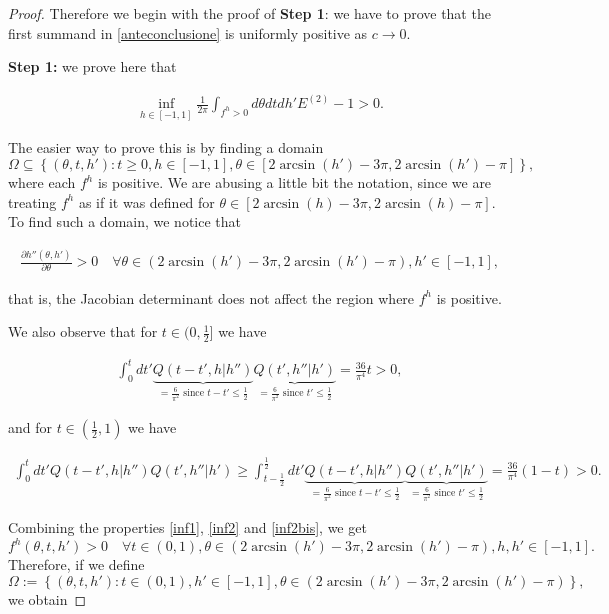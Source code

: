 \documentclass[a4paper,10pt,reqno]{amsart}
\numberwithin{equation}{subsection}
\numberwithin{figure}{subsection}
\begin{document}
\begin{proof}
Therefore we begin with the proof of \textbf{Step 1}: we have to prove that the first summand in \eqref{anteconclusione} is uniformly positive as $c\to0$.

\textbf{Step 1:} we prove here that

\begin{align}\label{derivataneg}
\inf_{h\in[-1,1]}\frac{1}{2\pi}\int_{f^h>0}d\theta dtdh' E^{(2)}-1>0.
\end{align}

The easier way to prove this is by finding a domain
\[
\Omega\subseteq\left\{(\theta,t,h'):t\geq0,h\in[-1,1],\theta\in[2\arcsin(h')-3\pi,2\arcsin(h')-\pi]\right\},
\]
where each $f^h$ is positive. We are abusing a little bit the notation, since we are treating $f^h$ as if it was defined for $\theta\in[2\arcsin(h)-3\pi,2\arcsin(h)-\pi]$. To find such a domain, we notice that

\begin{align}\label{inf1}
\frac{\partial h''(\theta,h')}{\partial\theta}>0\quad\forall\theta\in(2\arcsin(h')-3\pi,2\arcsin(h')-\pi),h'\in[-1,1],
\end{align}

that is, the Jacobian determinant does not affect the region where $f^h$ is positive.

We also observe that for $t\in(0,\frac{1}{2}]$ we have

\begin{align}\label{inf2}
\int_0^tdt' \underbrace{Q(t-t',h|h'')}_{=\frac{6}{\pi^2}\textrm{ since }t-t'\leq\frac{1}{2}}\underbrace{Q(t',h''|h')}_{=\frac{6}{\pi^2}\textrm{ since }t'\leq\frac{1}{2}}=\frac{36}{\pi^4}t>0,
\end{align}

and for $t\in(\frac{1}{2},1)$ we have

{\footnotesize\begin{align}\label{inf2bis}
\int_0^tdt' Q(t-t',h|h'')Q(t',h''|h')\geq\int_{t-\frac{1}{2}}^{\frac{1}{2}}dt' \underbrace{Q(t-t',h|h'')}_{=\frac{6}{\pi^2}\textrm{ since }t-t'\leq\frac{1}{2}}\underbrace{Q(t',h''|h')}_{=\frac{6}{\pi^2}\textrm{ since }t'\leq\frac{1}{2}}=\frac{36}{\pi^4}(1-t)>0.
\end{align}}

Combining the properties \eqref{inf1}, \eqref{inf2} and \eqref{inf2bis}, we get
\[
f^h(\theta,t,h')>0\quad\forall t\in(0,1),\theta\in(2\arcsin(h')-3\pi,2\arcsin(h')-\pi),h,h'\in[-1,1].
\]
Therefore, if we define
\[
\Omega:=\left\{(\theta,t,h'):t\in(0,1),h'\in[-1,1],\theta\in(2\arcsin(h')-3\pi,2\arcsin(h')-\pi)\right\},
\]
we obtain


\end{proof}
\end{document}
